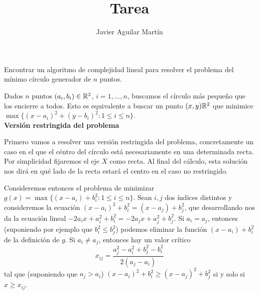 \documentclass[twoside]{article}
\begin{document}
\title{Tarea}
\author{Javier Aguilar Martín}
\maketitle


\begin{ejercicio}{1}
Encontrar un algoritmo de complejidad lineal para resolver el problema del mínimo círculo generador de $n$ puntos. 
\end{ejercicio}
\begin{solucion}
Dados $n$ puntos $(a_i,b_i)\in\mathbb{R}^2$, $i=1,\dots, n$, buscamos el círculo más pequeño que los encierre a todos. Esto es equivalente a buscar un punto $(x,y)\mathbb{R}^2$ que minimice $\max\{(x-a_i)^2+(y-b_i)^2: 1\leq i\leq n\}$.\\

\textbf{Versión restringida del problema}

Primero vamos a resolver una versión restringida del problema, concretamente un caso en el que el céntro del círculo está necesariamente en una determinada recta. Por simplicidad fijaremos el eje $X$ como recta. Al final del cálculo, esta solución nos dirá en qué lado de la recta estará el centro en el caso no  restringido. 

Consideremos entonces el problema de minimizar $g(x)=\max\{(x-a_i)+b_i^2:1\leq i\leq n\}$. Sean $i,j$ dos índices distintos y consideremos la ecuación $(x-a_i)^2+b_i^2=(x-a_j)+b_j^2$, que desarrollando nos da la ecuación lineal $-2a_ix+a_i^2+b_i^2=-2a_jx+a_j^2+b_j^2$. Si $a_i=a_j$, entonces (suponiendo por ejemplo que $b_i^2\leq b_j^2$) podemos eliminar la función $(x-a_i)+b_i^2$ de la definición de $g$. Si $a_i\neq a_j$, entonces hay un valor crítico 
\[
x_{ij}=\frac{a_j^2-a_i^2+b_j^2-b_i^2}{2(a_j-a_i)}
\]
tal que (suponiendo que $a_j>a_i$) $(x-a_i)^2+b_i^2\geq (x-a_j)^2+b_j^2$ si y solo si $x\geq x_{ij}$. 


\end{solucion}
\end{document}
